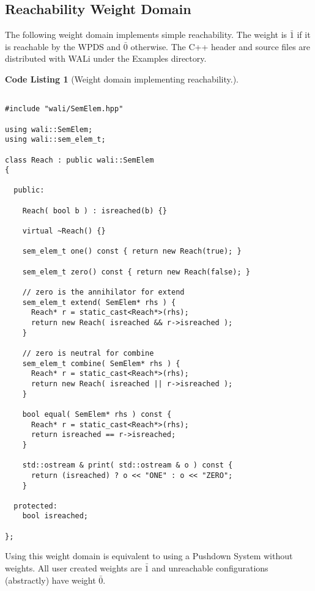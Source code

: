 \documentclass[english,a4paper,11pt]{article}
\theoremstyle{definition}
\newtheorem{codelist}{Code Listing}[section]
\def\ONE{\bar{1}}
\def\ZERO{\bar{0}}
\def\WALi{\textsf{WALi}\xspace}
\begin{document}
\subsection{Reachability Weight Domain}
The following weight domain implements simple reachability. The weight is
$\ONE$ if it is reachable by the WPDS and $\ZERO$ otherwise. The C++ header
\lstset{language=[GNU]C++,basicstyle=\ttfamily\small}
and source files are distributed with \WALi under the Examples directory.
\begin{codelist}[Weight domain implementing reachability.]
\label{Reach}
\begin{lstlisting}

#include "wali/SemElem.hpp"

using wali::SemElem;
using wali::sem_elem_t;

class Reach : public wali::SemElem
{

  public:

    Reach( bool b ) : isreached(b) {}

    virtual ~Reach() {}

    sem_elem_t one() const { return new Reach(true); }

    sem_elem_t zero() const { return new Reach(false); }

    // zero is the annihilator for extend
    sem_elem_t extend( SemElem* rhs ) {
      Reach* r = static_cast<Reach*>(rhs);
      return new Reach( isreached && r->isreached );
    }
        
    // zero is neutral for combine
    sem_elem_t combine( SemElem* rhs ) {
      Reach* r = static_cast<Reach*>(rhs);
      return new Reach( isreached || r->isreached );
    }
        
    bool equal( SemElem* rhs ) const {
      Reach* r = static_cast<Reach*>(rhs);
      return isreached == r->isreached;
    }

    std::ostream & print( std::ostream & o ) const {
      return (isreached) ? o << "ONE" : o << "ZERO";
    }

  protected:
    bool isreached;

};
\end{lstlisting}
\end{codelist}

Using this weight domain is equivalent to using a Pushdown System without
weights. All user created weights are $\ONE$ and unreachable configurations
(abstractly) have weight $\ZERO$.
\end{document}
